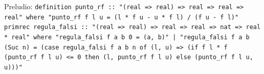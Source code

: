 \documentclass[11pt,a4paper]{article}
\begin{document}
{\footnotesize Preludio: \texttt{definition punto\_\allowbreak{}rf :\allowbreak{}:\allowbreak{} "(\allowbreak{}real =\allowbreak{}> real) =\allowbreak{}> real =\allowbreak{}> real =\allowbreak{}> real" where "punto\_\allowbreak{}rf f l u =\allowbreak{} (\allowbreak{}l *\allowbreak{} f u -\allowbreak{} u *\allowbreak{} f l) /\allowbreak{} (\allowbreak{}f u -\allowbreak{} f l)" primrec regula\_\allowbreak{}falsi :\allowbreak{}:\allowbreak{} "(\allowbreak{}real =\allowbreak{}> real) =\allowbreak{}> real =\allowbreak{}> real =\allowbreak{}> nat =\allowbreak{}> real *\allowbreak{} real" where "regula\_\allowbreak{}falsi f a b 0 =\allowbreak{} (\allowbreak{}a,\allowbreak{} b)" |\allowbreak{} "regula\_\allowbreak{}falsi f a b (\allowbreak{}Suc n) =\allowbreak{} (\allowbreak{}case regula\_\allowbreak{}falsi f a b n of (\allowbreak{}l,\allowbreak{} u) =\allowbreak{}> (\allowbreak{}if f l *\allowbreak{} f (\allowbreak{}punto\_\allowbreak{}rf f l u) <=\allowbreak{} 0 then (\allowbreak{}l,\allowbreak{} punto\_\allowbreak{}rf f l u) else (\allowbreak{}punto\_\allowbreak{}rf f l u,\allowbreak{} u)))"}\par}
\end{document}
